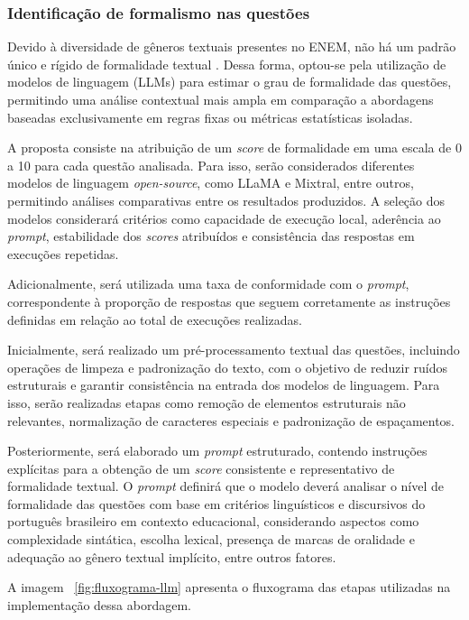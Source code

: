 \documentclass[a4paper,10pt, twocolumn]{article}
\begin{document}
\subsubsection{Identificação de formalismo nas questões}

Devido à diversidade de gêneros textuais presentes no ENEM, não há um padrão único e rígido de formalidade textual \cite{Ciapuscio2005,INEP_ENEM_Matriz}. Dessa forma, optou-se pela utilização de modelos de linguagem (LLMs) para estimar o grau de formalidade das questões, permitindo uma análise contextual mais ampla em comparação a abordagens baseadas exclusivamente em regras fixas ou métricas estatísticas isoladas.

A proposta consiste na atribuição de um \textit{score} de formalidade em uma escala de 0 a 10 para cada questão analisada. Para isso, serão considerados diferentes modelos de linguagem \textit{open-source}, como LLaMA e Mixtral, entre outros, permitindo análises comparativas entre os resultados produzidos. A seleção dos modelos considerará critérios como capacidade de execução local, aderência ao \textit{prompt}, estabilidade dos \textit{scores} atribuídos e consistência das respostas em execuções repetidas.

Adicionalmente, será utilizada uma taxa de conformidade com o \textit{prompt}, correspondente à proporção de respostas que seguem corretamente as instruções definidas em relação ao total de execuções realizadas.

Inicialmente, será realizado um pré-processamento textual das questões, incluindo operações de limpeza e padronização do texto, com o objetivo de reduzir ruídos estruturais e garantir consistência na entrada dos modelos de linguagem. Para isso, serão realizadas etapas como remoção de elementos estruturais não relevantes, normalização de caracteres especiais e padronização de espaçamentos.

Posteriormente, será elaborado um \textit{prompt} estruturado, contendo instruções explícitas para a obtenção de um \textit{score} consistente e representativo de formalidade textual. O \textit{prompt} definirá que o modelo deverá analisar o nível de formalidade das questões com base em critérios linguísticos e discursivos do português brasileiro em contexto educacional, considerando aspectos como complexidade sintática, escolha lexical, presença de marcas de oralidade e adequação ao gênero textual implícito, entre outros fatores.

A imagem ~\ref{fig:fluxograma-llm} apresenta o fluxograma das etapas utilizadas na implementação dessa abordagem.
\end{document}
